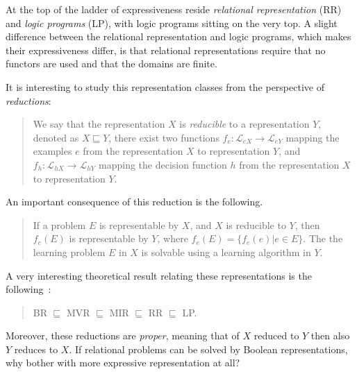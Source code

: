At the top of the ladder of expressiveness reside \textit{relational representation} (RR) and \textit{logic programs} (LP), with logic programs sitting on the very top.
A slight difference between the relational representation and logic programs, which makes their expressiveness differ, is that relational representations require that no functors are used and that the domains are finite.



It is interesting to study this representation classes from the perspective of \textit{reductions}:

\begin{quote}
	We say that the representation $X$ is \textit{reducible} to a representation $Y$, denoted as $X \sqsubseteq Y$, there exist two functions $f_e: \mathcal{L}_{eX} \rightarrow \mathcal{L}_{eY}$ mapping the examples $e$ from the representation $X$ to representation $Y$, and $f_h: \mathcal{L}_{hX} \rightarrow \mathcal{L}_{hY}$ mapping the decision function $h$ from the representation $X$ to representation $Y$.
\end{quote}


An important consequence of this reduction is the following.

\begin{quote}
	If a problem $E$ is representable by $X$, and $X$ is reducible to $Y$, then $f_e(E)$ is representable by $Y$, where $f_e(E) = \{ f_e(e) | e \in E\}$. The the learning problem $E$ in $X$ is solvable using a learning algorithm in $Y$.
\end{quote}



A very interesting theoretical result relating these representations is the following~\cite{10.1007/BFb0027304}:

\begin{quote}
	BR $\sqsubseteq$ MVR $\sqsubseteq$ MIR $\sqsubseteq$ RR $\sqsubseteq$ LP.
\end{quote}


Moreover, these reductions are \textit{proper}, meaning that of $X$ reduced to $Y$ then also $Y$ reduces to $X$.
If relational problems can be solved by Boolean representations,  why bother with more expressive representation at all?


